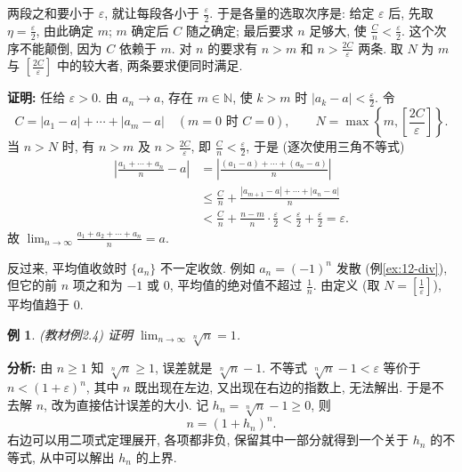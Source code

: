 \documentclass[UTF8,openany]{ctexbook}
\theoremstyle{chinesetextbook}
\newtheorem{example}{例}[section]
\newenvironment{cnproof}{\par\indent\textbf{证明:} \ignorespaces}{\par}
\begin{document}
两段之和要小于 $\varepsilon$, 就让每段各小于 $\displaystyle\frac\varepsilon2$. 于是各量的选取次序是: 给定 $\varepsilon$ 后, 先取 $\displaystyle\eta=\frac\varepsilon2$, 由此确定 $m$; $m$ 确定后 $C$ 随之确定; 最后要求 $n$ 足够大, 使 $\displaystyle\frac Cn<\frac\varepsilon2$. 这个次序不能颠倒, 因为 $C$ 依赖于 $m$. 对 $n$ 的要求有 $n>m$ 和 $\displaystyle n>\frac{2C}\varepsilon$ 两条. 取 $N$ 为 $m$ 与 $\displaystyle\left[\frac{2C}\varepsilon\right]$ 中的较大者, 两条要求便同时满足.
\begin{cnproof}
任给 $\varepsilon>0$. 由 $a_n\to a$, 存在 $m\in\mathbb N$, 使 $k>m$ 时 $\displaystyle|a_k-a|<\frac\varepsilon2$. 令
\[
C=|a_1-a|+\cdots+|a_m-a|\quad(m=0\text{ 时 }C=0),\qquad N=\max\left\{m,\left[\frac{2C}\varepsilon\right]\right\}.
\]
当 $n>N$ 时, 有 $n>m$ 及 $\displaystyle n>\frac{2C}\varepsilon$, 即 $\displaystyle\frac Cn<\frac\varepsilon2$, 于是 (逐次使用三角不等式)
\[
\begin{aligned}
\left|\frac{a_1+\cdots+a_n}n-a\right|
&=\left|\frac{(a_1-a)+\cdots+(a_n-a)}n\right|\\
&\le\frac Cn+\frac{|a_{m+1}-a|+\cdots+|a_n-a|}n\\
&<\frac Cn+\frac{n-m}n\cdot\frac\varepsilon2
<\frac\varepsilon2+\frac\varepsilon2=\varepsilon.
\end{aligned}
\]
故 $\displaystyle\lim_{n\to\infty}\frac{a_1+a_2+\cdots+a_n}n=a$.
\end{cnproof}
反过来, 平均值收敛时 $\{a_n\}$ 不一定收敛. 例如 $a_n=(-1)^n$ 发散 (例\ref{ex:12-div}), 但它的前 $n$ 项之和为 $-1$ 或 $0$, 平均值的绝对值不超过 $\displaystyle\frac1n$. 由定义 (取 $\displaystyle N=\left[\frac1\varepsilon\right]$), 平均值趋于 $0$.
\begin{example}\label{ex:2-4}
\textnormal{(教材例2.4)} 证明 $\displaystyle\lim_{n\to\infty}\sqrt[n]n=1$.
\end{example}
\par\indent\textbf{分析:} 由 $n\ge1$ 知 $\sqrt[n]n\ge1$, 误差就是 $\sqrt[n]n-1$. 不等式 $\sqrt[n]n-1<\varepsilon$ 等价于 $n<(1+\varepsilon)^n$, 其中 $n$ 既出现在左边, 又出现在右边的指数上, 无法解出. 于是不去解 $n$, 改为直接估计误差的大小. 记 $h_n=\sqrt[n]n-1\ge0$, 则
\[
n=(1+h_n)^n.
\]
右边可以用二项式定理展开, 各项都非负, 保留其中一部分就得到一个关于 $h_n$ 的不等式, 从中可以解出 $h_n$ 的上界.
\end{document}
